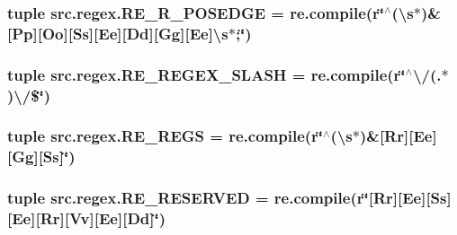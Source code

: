 \hypertarget{namespacesrc_1_1regex_afa1175087f670152b7cc86a821f9548c}{
\subsubsection[{R\-E\-\_\-\-R\-\_\-\-P\-O\-S\-E\-D\-G\-E}]{\setlength{\rightskip}{0pt plus 5cm}tuple src.\-regex.\-R\-E\-\_\-\-R\-\_\-\-P\-O\-S\-E\-D\-G\-E = re.\-compile(r\char`\"{}$^\wedge$(\textbackslash{}s$\ast$)\&\mbox{[}Pp\mbox{]}\mbox{[}Oo\mbox{]}\mbox{[}Ss\mbox{]}\mbox{[}Ee\mbox{]}\mbox{[}Dd\mbox{]}\mbox{[}Gg\mbox{]}\mbox{[}Ee\mbox{]}\textbackslash{}s$\ast$;\char`\"{})}}\label{namespacesrc_1_1regex_afa1175087f670152b7cc86a821f9548c}
\hypertarget{namespacesrc_1_1regex_a7f83ff6aa8c60ead1a2b325bc4e5b438}{
\subsubsection[{R\-E\-\_\-\-R\-E\-G\-E\-X\-\_\-\-S\-L\-A\-S\-H}]{\setlength{\rightskip}{0pt plus 5cm}tuple src.\-regex.\-R\-E\-\_\-\-R\-E\-G\-E\-X\-\_\-\-S\-L\-A\-S\-H = re.\-compile(r\char`\"{}$^\wedge$\textbackslash{}/(.$\ast$)\textbackslash{}/\$\char`\"{})}}\label{namespacesrc_1_1regex_a7f83ff6aa8c60ead1a2b325bc4e5b438}
\hypertarget{namespacesrc_1_1regex_a77897e390173c7fccbb5530ec5df6f37}{
\subsubsection[{R\-E\-\_\-\-R\-E\-G\-S}]{\setlength{\rightskip}{0pt plus 5cm}tuple src.\-regex.\-R\-E\-\_\-\-R\-E\-G\-S = re.\-compile(r\char`\"{}$^\wedge$(\textbackslash{}s$\ast$)\&\mbox{[}Rr\mbox{]}\mbox{[}Ee\mbox{]}\mbox{[}Gg\mbox{]}\mbox{[}Ss\mbox{]}\char`\"{})}}\label{namespacesrc_1_1regex_a77897e390173c7fccbb5530ec5df6f37}
\hypertarget{namespacesrc_1_1regex_aa98aca764dcf2bb5a7f16b1fe95339b9}{
\subsubsection[{R\-E\-\_\-\-R\-E\-S\-E\-R\-V\-E\-D}]{\setlength{\rightskip}{0pt plus 5cm}tuple src.\-regex.\-R\-E\-\_\-\-R\-E\-S\-E\-R\-V\-E\-D = re.\-compile(r\char`\"{}\mbox{[}Rr\mbox{]}\mbox{[}Ee\mbox{]}\mbox{[}Ss\mbox{]}\mbox{[}Ee\mbox{]}\mbox{[}Rr\mbox{]}\mbox{[}Vv\mbox{]}\mbox{[}Ee\mbox{]}\mbox{[}Dd\mbox{]}\char`\"{})}}\label{namespacesrc_1_1regex_aa98aca764dcf2bb5a7f16b1fe95339b9}

